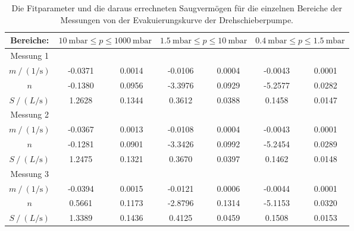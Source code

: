    \begin{table}[h]
      \centering
      \caption{Die Fitparameter und die daraus errechneten Saugvermögen für die einzelnen Bereiche der Messungen von der Evakuierungskurve der Drehschieberpumpe.}
      \label{tab:fitpara_dreh_alt}
      \begin{tabular}{c | S[table-format=2.4] @{${}\pm{}$} S | S[table-format=2.4] @{${}\pm{}$} S | S[table-format=2.4] @{${}\pm{}$} S}
        \toprule
        {Bereiche:} &  &  & \\
        \midrule
        Messung 1 \\ 
        \cmidrule(lr){1-1}
        $m \mathbin{/} \left(\si{1\per\second}\right)$ & -0.0371 & 0.0014 & -0.0106 & 0.0004 & -0.0043 & 0.0001 \\
        $n$                                            & -0.1380 & 0.0956 & -3.3976 & 0.0929 & -5.2577 & 0.0282 \\
        $S \mathbin{/} \left(\si{L\per\second}\right)$ &  1.2628 & 0.1344 &  0.3612 & 0.0388 &  0.1458 & 0.0147 \\
        \midrule
        Messung 2 \\ 
        \cmidrule(lr){1-1}
        $m \mathbin{/} \left(\si{1\per\second}\right)$ & -0.0367 & 0.0013 & -0.0108 & 0.0004 & -0.0043 & 0.0001 \\
        $n$                                            & -0.1281 & 0.0901 & -3.3426 & 0.0992 & -5.2454 & 0.0289 \\
        $S \mathbin{/} \left(\si{L\per\second}\right)$ &  1.2475 & 0.1321 &  0.3670 & 0.0397 &  0.1462 & 0.0148 \\
        \midrule
        Messung 3 \\ 
        \cmidrule(lr){1-1}
        $m \mathbin{/} \left(\si{1\per\second}\right)$ & -0.0394 & 0.0015 & -0.0121 & 0.0006 & -0.0044 & 0.0001 \\
        $n$                                            &  0.5661 & 0.1173 & -2.8796 & 0.1314 & -5.1153 & 0.0320 \\
        $S \mathbin{/} \left(\si{L\per\second}\right)$ &  1.3389 & 0.1436 &  0.4125 & 0.0459 &  0.1508 & 0.0153 \\      
        \bottomrule
      \end{tabular}
    \end{table}

